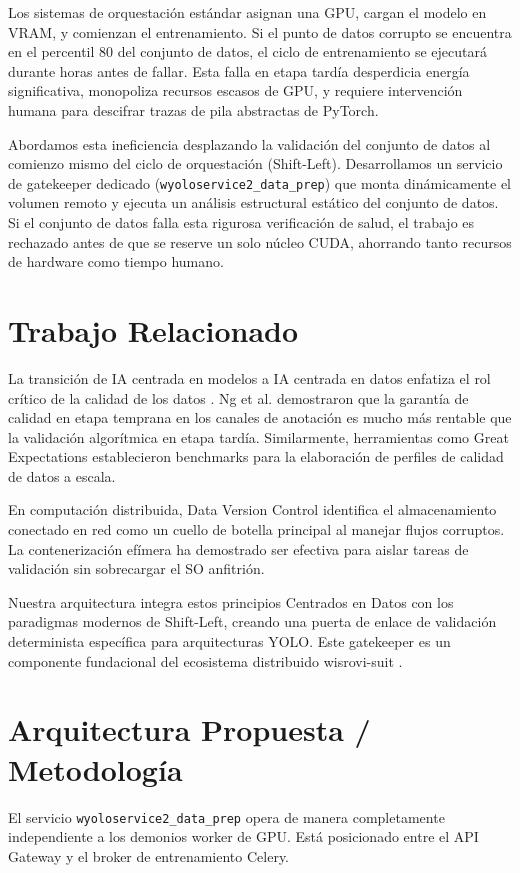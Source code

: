 \documentclass[11pt,a4paper]{article}
\begin{document}
Los sistemas de orquestación estándar asignan una GPU, cargan el modelo en VRAM, y comienzan el entrenamiento. Si el punto de datos corrupto se encuentra en el percentil 80 del conjunto de datos, el ciclo de entrenamiento se ejecutará durante horas antes de fallar. Esta falla en etapa tardía desperdicia energía significativa, monopoliza recursos escasos de GPU, y requiere intervención humana para descifrar trazas de pila abstractas de PyTorch.

Abordamos esta ineficiencia desplazando la validación del conjunto de datos al comienzo mismo del ciclo de orquestación (Shift-Left). Desarrollamos un servicio de gatekeeper dedicado (\texttt{wyoloservice2\_data\_prep}) que monta dinámicamente el volumen remoto y ejecuta un análisis estructural estático del conjunto de datos. Si el conjunto de datos falla esta rigurosa verificación de salud, el trabajo es rechazado antes de que se reserve un solo núcleo CUDA, ahorrando tanto recursos de hardware como tiempo humano.

\section{Trabajo Relacionado}
La transición de IA centrada en modelos a IA centrada en datos enfatiza el rol crítico de la calidad de los datos \cite{zha2023data}. Ng et al. \cite{ng2021data} demostraron que la garantía de calidad en etapa temprana en los canales de anotación es mucho más rentable que la validación algorítmica en etapa tardía. Similarmente, herramientas como Great Expectations \cite{greatexpectations2023} establecieron benchmarks para la elaboración de perfiles de calidad de datos a escala.

En computación distribuida, Data Version Control \cite{kuprie2022dvc} identifica el almacenamiento conectado en red como un cuello de botella principal al manejar flujos corruptos. La contenerización efímera ha demostrado ser efectiva para aislar tareas de validación sin sobrecargar el SO anfitrión.

Nuestra arquitectura integra estos principios Centrados en Datos con los paradigmas modernos de Shift-Left, creando una puerta de enlace de validación determinista específica para arquitecturas YOLO. Este gatekeeper es un componente fundacional del ecosistema distribuido wisrovi-suit \cite{rodriguez2024wisrovi}.

\section{Arquitectura Propuesta / Metodología}
El servicio \texttt{wyoloservice2\_data\_prep} opera de manera completamente independiente a los demonios worker de GPU. Está posicionado entre el API Gateway y el broker de entrenamiento Celery.
\end{document}
